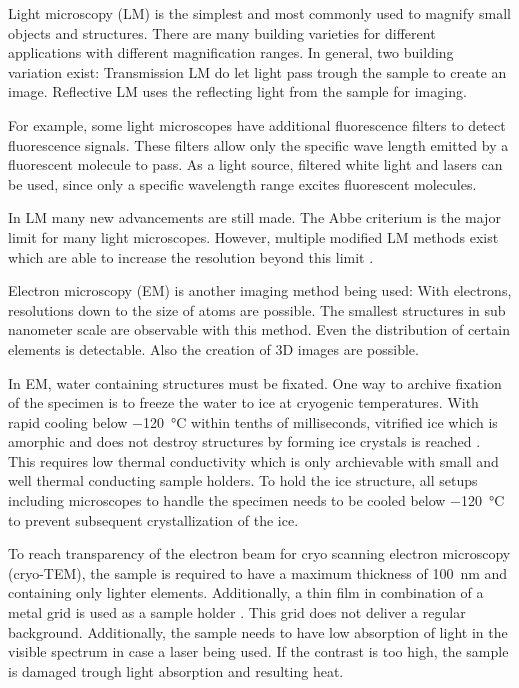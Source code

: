 
Light microscopy (LM) is the simplest and most commonly used to magnify small objects and structures. There are many building varieties for different applications with different magnification ranges. In general, two building variation exist: Transmission LM do let light pass trough the sample to create an image. Reflective LM uses the reflecting light from the sample for imaging. 

For example, some light microscopes have additional fluorescence filters to detect fluorescence signals. These filters allow only the specific wave length emitted by a fluorescent molecule to pass. As a light source, filtered white light and lasers can be used, since only a specific wavelength range excites fluorescent molecules.

In LM many new advancements are still made. The Abbe criterium is the major limit for many light microscopes. However, multiple modified LM methods exist which are able to increase the resolution beyond this limit \cite{Heintzmann.2006}.

Electron microscopy (EM) is another imaging method being used: With electrons, resolutions down to the size of atoms are possible. The smallest structures in sub nanometer scale are observable with this method. Even the distribution of certain elements is detectable. Also the creation of 3D images are possible.

In EM, water containing structures must be fixated. One way to archive fixation of the specimen is to freeze the water to ice at cryogenic temperatures. With rapid cooling below \SI{-120}{\degreeCelsius} within tenths of milliseconds, vitrified ice which is amorphic and does not destroy structures by forming ice crystals is reached  \cite{Wowk.2010}. This requires low thermal conductivity which is only archievable with small and well thermal conducting sample holders. To hold the ice structure, all setups including microscopes to handle the specimen needs to be cooled below \SI{-120}{\degreeCelsius} to prevent subsequent crystallization of the ice.

To reach transparency of the electron beam for cryo scanning electron microscopy (cryo-TEM), the sample is required to have a maximum thickness of \SI{100}{\nano\meter} and containing only lighter elements. Additionally, a thin film in combination of a metal grid is used as a sample holder \cite{Danino.2012}. This grid does not deliver a regular background. Additionally, the sample needs to have low absorption of light in the visible spectrum in case a laser being used. If the contrast is too high, the sample is damaged trough light absorption and resulting heat.

